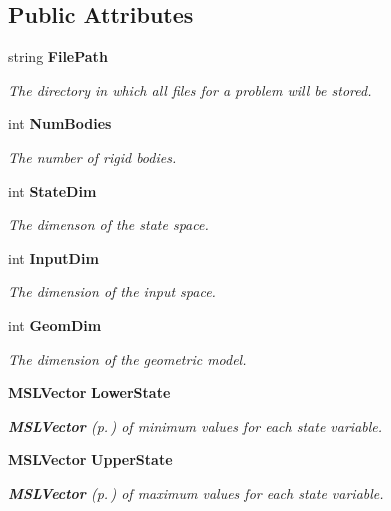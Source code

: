 \subsection*{Public Attributes}
\begin{CompactItemize}
\item 
string {\bf File\-Path}
\begin{CompactList}\small\item\em The directory in which all files for a problem will be stored.\item\end{CompactList}\item 
int {\bf Num\-Bodies}
\begin{CompactList}\small\item\em The number of rigid bodies.\item\end{CompactList}\item 
int {\bf State\-Dim}
\begin{CompactList}\small\item\em The dimenson of the state space.\item\end{CompactList}\item 
int {\bf Input\-Dim}
\begin{CompactList}\small\item\em The dimension of the input space.\item\end{CompactList}\item 
int {\bf Geom\-Dim}
\begin{CompactList}\small\item\em The dimension of the geometric model.\item\end{CompactList}\item 
{\bf MSLVector} {\bf Lower\-State}
\begin{CompactList}\small\item\em {\bf MSLVector} {\rm (p.\,\pageref{classMSLVector})} of minimum values for each state variable.\item\end{CompactList}\item 
{\bf MSLVector} {\bf Upper\-State}
\begin{CompactList}\small\item\em {\bf MSLVector} {\rm (p.\,\pageref{classMSLVector})} of maximum values for each state variable.\item\end{CompactList}\item 

\end{CompactItemize}
